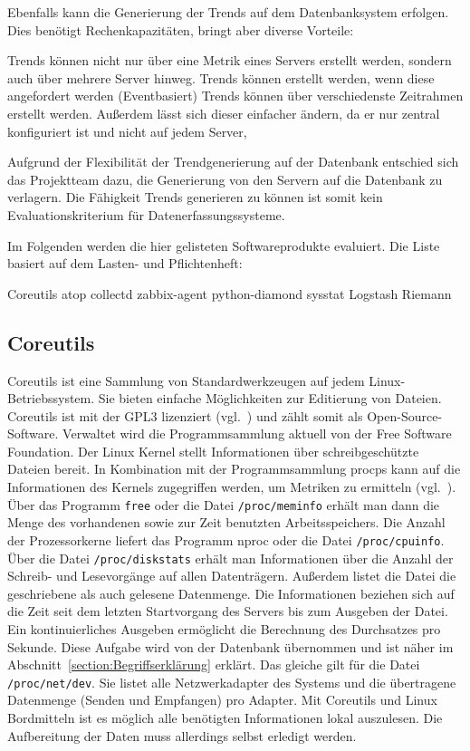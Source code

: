 Ebenfalls kann die Generierung der Trends auf dem Datenbanksystem erfolgen.
Dies benötigt Rechenkapazitäten, bringt aber diverse Vorteile:

\begin{outline}
  \1 Trends können nicht nur über eine Metrik eines Servers erstellt werden,
  sondern auch über mehrere Server hinweg.
  \1 Trends können erstellt werden, wenn diese angefordert werden
  (Eventbasiert)
  \1 Trends können über verschiedenste Zeitrahmen erstellt werden. Außerdem
  lässt sich dieser einfacher ändern, da er nur zentral konfiguriert ist und
  nicht auf jedem Server,
\end{outline}

Aufgrund der Flexibilität der Trendgenerierung auf der Datenbank entschied sich
das Projektteam dazu, die Generierung von den Servern auf die Datenbank zu
verlagern. Die Fähigkeit Trends generieren zu können ist somit kein
Evaluationskriterium für Datenerfassungssysteme.

Im Folgenden werden die hier gelisteten Softwareprodukte evaluiert. Die Liste
basiert auf dem Lasten- und Pflichtenheft:

\begin{outline}
  \1 Coreutils
  \1 atop
  \1 collectd
  \1 zabbix\hyp{}agent
  \1 python\hyp{}diamond
  \1 sysstat
  \1 Logstash
  \1 Riemann
\end{outline}
\tm%

\subsection{Coreutils}
Coreutils ist eine Sammlung von Standardwerkzeugen auf jedem
Linux\hyp{}Betriebssystem. Sie bieten einfache Möglichkeiten zur Editierung von
Dateien. Coreutils ist mit der GPL3 lizenziert (vgl.~\cite{coreutils}) und
zählt somit als Open\hyp{}Source\hyp{}Software. Verwaltet wird die
Programmsammlung aktuell von der Free Software Foundation. Der Linux Kernel
stellt Informationen über schreibgeschützte Dateien bereit. In Kombination mit
der Programmsammlung procps kann auf die Informationen des Kernels zugegriffen
werden, um Metriken zu ermitteln (vgl.~\cite{procps}). Über das Programm
\texttt{free} oder die Datei \texttt{/proc/meminfo} erhält man dann die Menge
des vorhandenen sowie zur Zeit benutzten Arbeitsspeichers. Die Anzahl der
Prozessorkerne liefert das Programm nproc oder die Datei
\texttt{/proc/cpuinfo}. Über die Datei \texttt{/proc/diskstats} erhält man
Informationen über die Anzahl der Schreib- und Lesevorgänge auf allen
Datenträgern. Außerdem listet die Datei die geschriebene als auch gelesene
Datenmenge. Die Informationen beziehen sich auf die Zeit seit dem letzten
Startvorgang des Servers bis zum Ausgeben der Datei. Ein kontinuierliches
Ausgeben ermöglicht die Berechnung des Durchsatzes pro Sekunde. Diese Aufgabe
wird von der Datenbank übernommen und ist näher im
Abschnitt~\ref{section:Begriffserklärung} erklärt. Das gleiche gilt für die
Datei \texttt{/proc/net/dev}. Sie listet alle Netzwerkadapter des Systems und
die übertragene Datenmenge (Senden und Empfangen) pro Adapter. Mit Coreutils
und Linux Bordmitteln ist es möglich alle benötigten Informationen lokal
auszulesen. Die Aufbereitung der Daten muss allerdings selbst erledigt werden.

